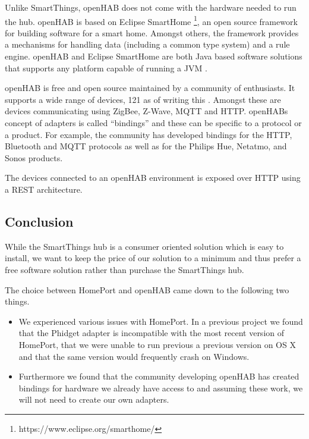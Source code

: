 Unlike SmartThings, openHAB \cite{OPENHAB} does not come with the hardware needed to run the hub.
openHAB is based on Eclipse SmartHome \footnote{https://www.eclipse.org/smarthome/}, an open source framework for building software for a smart home. Amongst others, the framework provides a mechanisms for handling data (including a common type system) and a rule engine.
openHAB and Eclipse SmartHome are both Java based software solutions that supports any platform capable of running a JVM \cite{openhab:introduction}.

openHAB is free and open source maintained by a community of enthusiasts. It supports a wide range of devices, 121 as of writing this \cite{openhab:supported-technologies}. Amongst these are devices communicating using ZigBee, Z-Wave, MQTT and HTTP. openHABs concept of adapters is called ``bindings'' and these can be specific to a protocol or a product. For example, the community has developed bindings for the HTTP, Bluetooth and MQTT protocols as well as for the Philips Hue, Netatmo, and Sonos products.

The devices connected to an openHAB environment is exposed over HTTP using a REST architecture.

\subsection{Conclusion}
\label{sec:analysis:choice-of-hub:conclusion}

While the SmartThings hub is a consumer oriented solution which is easy to install, we want to keep the price of our solution to a minimum and thus prefer a free software solution rather than purchase the SmartThings hub.

The choice between HomePort and openHAB came down to the following two things.

\begin{itemize}
\item We experienced various issues with HomePort. In a previous project \cite{prespecialisation} we found that the Phidget adapter is incompatible with the most recent version of HomePort, that we were unable to run previous a previous version on OS X and that the same version would frequently crash on Windows.
\item Furthermore we found that the community developing openHAB has created bindings for hardware we already have access to and assuming these work, we will not need to create our own adapters.
\end{itemize}

